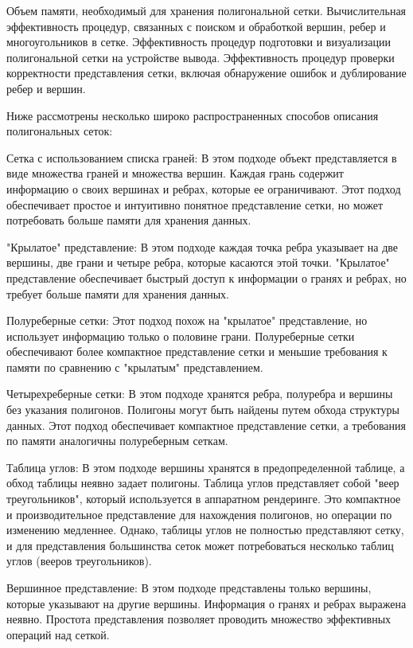     Объем памяти, необходимый для хранения полигональной сетки.
    Вычислительная эффективность процедур, связанных с поиском и обработкой вершин, ребер и многоугольников в сетке.
    Эффективность процедур подготовки и визуализации полигональной сетки на устройстве вывода.
    Эффективность процедур проверки корректности представления сетки, включая обнаружение ошибок и дублирование ребер и вершин.

Ниже рассмотрены несколько широко распространенных способов описания полигональных сеток:

    Сетка с использованием списка граней: В этом подходе объект представляется в виде множества граней и множества вершин. Каждая грань содержит информацию о своих вершинах и ребрах, которые ее ограничивают. Этот подход обеспечивает простое и интуитивно понятное представление сетки, но может потребовать больше памяти для хранения данных.

    "Крылатое" представление: В этом подходе каждая точка ребра указывает на две вершины, две грани и четыре ребра, которые касаются этой точки. "Крылатое" представление обеспечивает быстрый доступ к информации о гранях и ребрах, но требует больше памяти для хранения данных.

    Полуреберные сетки: Этот подход похож на "крылатое" представление, но использует информацию только о половине грани. Полуреберные сетки обеспечивают более компактное представление сетки и меньшие требования к памяти по сравнению с "крылатым" представлением.

    Четырехреберные сетки: В этом подходе хранятся ребра, полуребра и вершины без указания полигонов. Полигоны могут быть найдены путем обхода структуры данных. Этот подход обеспечивает компактное представление сетки, а требования по памяти аналогичны полуреберным сеткам.

    Таблица углов: В этом подходе вершины хранятся в предопределенной таблице, а обход таблицы неявно задает полигоны. Таблица углов представляет собой "веер треугольников", который используется в аппаратном рендеринге. Это компактное и производительное представление для нахождения полигонов, но операции по изменению медленнее. Однако, таблицы углов не полностью представляют сетку, и для представления большинства сеток может потребоваться несколько таблиц углов (вееров треугольников).

    Вершинное представление: В этом подходе представлены только вершины, которые указывают на другие вершины. Информация о гранях и ребрах выражена неявно. Простота представления позволяет проводить множество эффективных операций над сеткой.



